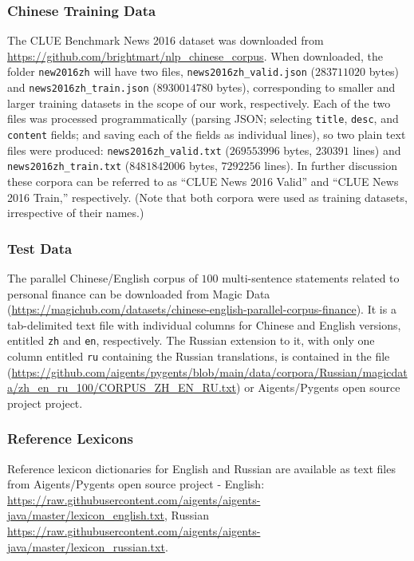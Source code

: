 \documentclass[11pt]{article}
\begin{document}
\subsubsection{Chinese Training Data}

The CLUE Benchmark News 2016 dataset was downloaded from \url{https://github.com/brightmart/nlp_chinese_corpus}. When downloaded, the folder \texttt{new2016zh} will have two files, \texttt{news2016zh\_valid.json} ($283711020$ bytes) and \texttt{news2016zh\_train.json} ($8930014780$ bytes), corresponding to smaller and larger training datasets in the scope of our work, respectively. Each of the two files was processed programmatically (parsing JSON; selecting \texttt{title}, \texttt{desc}, and \texttt{content} fields; and saving each of the fields as individual lines), so two plain text files were produced: \texttt{news2016zh\_valid.txt} ($269553996$ bytes, $230391$ lines) and \texttt{news2016zh\_train.txt} ($8481842006$ bytes, $7292256$ lines). In further discussion these corpora can be referred to as “CLUE News 2016 Valid” and “CLUE News 2016 Train,” respectively. (Note that both corpora were used as training datasets, irrespective of their names.)

\subsubsection{Test Data}

The parallel Chinese/English corpus of $100$ multi-sentence statements related to personal finance can be downloaded from Magic Data (\url{https://magichub.com/datasets/chinese-english-parallel-corpus-finance}). It is a tab-delimited text file with individual columns for Chinese and English versions, entitled \texttt{zh} and \texttt{en}, respectively. The Russian extension to it, with only one column entitled \texttt{ru} containing the Russian translations, is contained in the file (\url{https://github.com/aigents/pygents/blob/main/data/corpora/Russian/magicdata/zh_en_ru_100/CORPUS_ZH_EN_RU.txt}) or Aigents/Pygents open source project project.

\subsubsection{Reference Lexicons}

Reference lexicon dictionaries for English and Russian are available as text files from Aigents/Pygents open source project - English: \url{https://raw.githubusercontent.com/aigents/aigents-java/master/lexicon_english.txt}, Russian \url{https://raw.githubusercontent.com/aigents/aigents-java/master/lexicon_russian.txt}.
\end{document}
